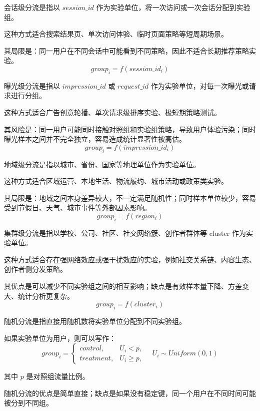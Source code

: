 \begin{theorem}[会话级分流]
会话级分流是指以 $session\_id$ 作为实验单位，将一次访问或一次会话分配到实验组。

这种方式适合搜索结果页、单次访问体验、临时页面策略等短周期场景。

其局限是：同一用户在不同会话中可能看到不同策略，因此不适合长期推荐策略实验。
\[
group_i = f(session\_id_i)
\]
\end{theorem}

\begin{theorem}[曝光级分流]
曝光级分流是指以 $impression\_id$ 或 $request\_id$ 作为实验单位，对每一次曝光或请求进行分组。

这种方式适合广告创意轮播、单次请求级排序实验、极短期策略测试。

其风险是：同一用户可能同时接触对照组和实验组策略，导致用户体验污染；同时曝光样本之间并不完全独立，容易造成统计显著性被高估。
\[
group_i = f(impression\_id_i)
\]
\end{theorem}

\begin{theorem}[地域级分流]
地域级分流是指以城市、省份、国家等地理单位作为实验单位。

这种方式适合区域运营、本地生活、物流履约、城市活动或政策类实验。

其局限是：地域之间本身差异较大，不一定满足随机性；同时样本单位较少，容易受到节假日、天气、城市事件等外部因素影响。
\[
group_i = f(region_i)
\]
\end{theorem}

\begin{theorem}[集群级分流]
集群级分流是指以学校、公司、社区、社交网络簇、创作者群体等 cluster 作为实验单位。

这种方式适合存在强网络效应或强干扰效应的实验，例如社交关系链、内容生态、创作者侧分发策略。

其优点是可以减少不同实验组之间的相互影响；缺点是有效样本量下降、方差变大、统计分析更复杂。
\[
group_i = f(cluster_i)
\]
\end{theorem}

\begin{theorem}[随机分流]
随机分流是指直接用随机数将实验单位分配到不同实验组。

如果实验单位为用户，则可以写作：
\[
group_i =
\begin{cases}
control, & U_i < p, \\
treatment, & U_i \geq p,
\end{cases}
\quad U_i \sim Uniform(0,1)
\]

其中 $p$ 是对照组流量比例。

随机分流的优点是简单直接；缺点是如果没有稳定键，同一个用户在不同时间可能被分到不同组。
\end{theorem}


